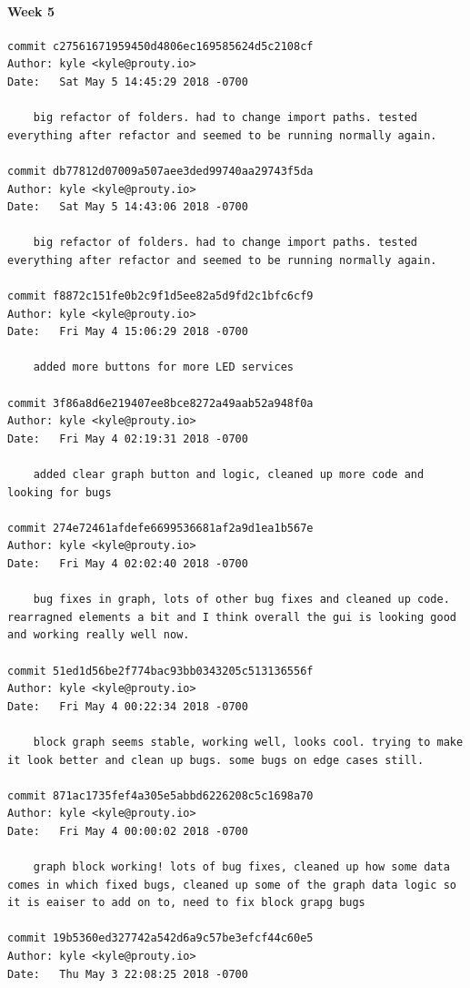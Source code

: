 \documentclass[draftclsnofoot, onecolumn, compsoc, 10pt]{IEEEtran}
\begin{document}
\paragraph{Week 5}
\begin{lstlisting}
commit c27561671959450d4806ec169585624d5c2108cf 
Author: kyle <kyle@prouty.io> 
Date:   Sat May 5 14:45:29 2018 -0700 

    big refactor of folders. had to change import paths. tested everything after refactor and seemed to be running normally again. 

commit db77812d07009a507aee3ded99740aa29743f5da 
Author: kyle <kyle@prouty.io> 
Date:   Sat May 5 14:43:06 2018 -0700 

    big refactor of folders. had to change import paths. tested everything after refactor and seemed to be running normally again. 

commit f8872c151fe0b2c9f1d5ee82a5d9fd2c1bfc6cf9 
Author: kyle <kyle@prouty.io> 
Date:   Fri May 4 15:06:29 2018 -0700 

    added more buttons for more LED services 

commit 3f86a8d6e219407ee8bce8272a49aab52a948f0a 
Author: kyle <kyle@prouty.io> 
Date:   Fri May 4 02:19:31 2018 -0700 

    added clear graph button and logic, cleaned up more code and looking for bugs 

commit 274e72461afdefe6699536681af2a9d1ea1b567e 
Author: kyle <kyle@prouty.io> 
Date:   Fri May 4 02:02:40 2018 -0700 

    bug fixes in graph, lots of other bug fixes and cleaned up code. rearragned elements a bit and I think overall the gui is looking good and working really well now. 

commit 51ed1d56be2f774bac93bb0343205c513136556f 
Author: kyle <kyle@prouty.io> 
Date:   Fri May 4 00:22:34 2018 -0700 

    block graph seems stable, working well, looks cool. trying to make it look better and clean up bugs. some bugs on edge cases still. 

commit 871ac1735fef4a305e5abbd6226208c5c1698a70 
Author: kyle <kyle@prouty.io> 
Date:   Fri May 4 00:00:02 2018 -0700 

    graph block working! lots of bug fixes, cleaned up how some data comes in which fixed bugs, cleaned up some of the graph data logic so it is eaiser to add on to, need to fix block grapg bugs 

commit 19b5360ed327742a542d6a9c57be3efcf44c60e5 
Author: kyle <kyle@prouty.io> 
Date:   Thu May 3 22:08:25 2018 -0700 


\end{lstlisting}
\end{document}
